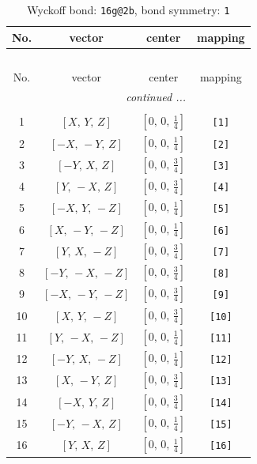 \documentclass[fleqn,8pt]{jsarticle}
\begin{document}
\begin{longtable}{cccc}
\caption{Wyckoff bond: {\tt 16g@2b}, bond symmetry: {\tt 1}}
 \\
 \hline \hline
No. & vector & center & mapping \\ \hline \endfirsthead

\multicolumn{3}{l}{\tablename\ \thetable{}} \\
 \hline \hline
No. & vector & center & mapping \\ \hline \endhead

 \hline \hline
\multicolumn{3}{r}{\footnotesize\it continued ...} \\ \endfoot

 \hline \hline
\multicolumn{3}{r}{} \\ \endlastfoot

1 & $\left[ X,\, Y,\, Z \right]$ & $\left[ 0,\, 0,\, \frac{1}{4} \right]$ & {\tt [1]} \\ \hline
2 & $\left[ - X,\, - Y,\, Z \right]$ & $\left[ 0,\, 0,\, \frac{1}{4} \right]$ & {\tt [2]} \\ \hline
3 & $\left[ - Y,\, X,\, Z \right]$ & $\left[ 0,\, 0,\, \frac{3}{4} \right]$ & {\tt [3]} \\ \hline
4 & $\left[ Y,\, - X,\, Z \right]$ & $\left[ 0,\, 0,\, \frac{3}{4} \right]$ & {\tt [4]} \\ \hline
5 & $\left[ - X,\, Y,\, - Z \right]$ & $\left[ 0,\, 0,\, \frac{1}{4} \right]$ & {\tt [5]} \\ \hline
6 & $\left[ X,\, - Y,\, - Z \right]$ & $\left[ 0,\, 0,\, \frac{1}{4} \right]$ & {\tt [6]} \\ \hline
7 & $\left[ Y,\, X,\, - Z \right]$ & $\left[ 0,\, 0,\, \frac{3}{4} \right]$ & {\tt [7]} \\ \hline
8 & $\left[ - Y,\, - X,\, - Z \right]$ & $\left[ 0,\, 0,\, \frac{3}{4} \right]$ & {\tt [8]} \\ \hline
9 & $\left[ - X,\, - Y,\, - Z \right]$ & $\left[ 0,\, 0,\, \frac{3}{4} \right]$ & {\tt [9]} \\ \hline
10 & $\left[ X,\, Y,\, - Z \right]$ & $\left[ 0,\, 0,\, \frac{3}{4} \right]$ & {\tt [10]} \\ \hline
11 & $\left[ Y,\, - X,\, - Z \right]$ & $\left[ 0,\, 0,\, \frac{1}{4} \right]$ & {\tt [11]} \\ \hline
12 & $\left[ - Y,\, X,\, - Z \right]$ & $\left[ 0,\, 0,\, \frac{1}{4} \right]$ & {\tt [12]} \\ \hline
13 & $\left[ X,\, - Y,\, Z \right]$ & $\left[ 0,\, 0,\, \frac{3}{4} \right]$ & {\tt [13]} \\ \hline
14 & $\left[ - X,\, Y,\, Z \right]$ & $\left[ 0,\, 0,\, \frac{3}{4} \right]$ & {\tt [14]} \\ \hline
15 & $\left[ - Y,\, - X,\, Z \right]$ & $\left[ 0,\, 0,\, \frac{1}{4} \right]$ & {\tt [15]} \\ \hline
16 & $\left[ Y,\, X,\, Z \right]$ & $\left[ 0,\, 0,\, \frac{1}{4} \right]$ & {\tt [16]} \\
\end{longtable}
\end{document}
